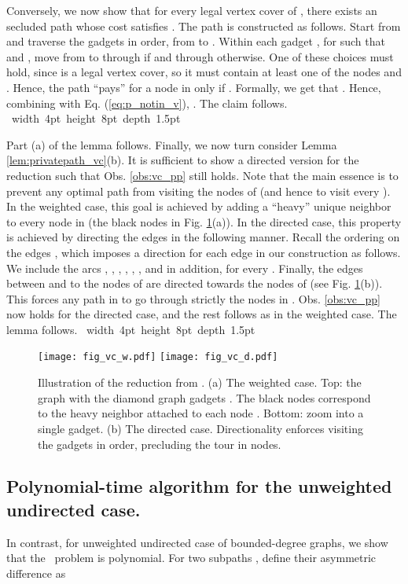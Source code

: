 \documentclass[12pt]{article}
\def\blackslug{\hbox{\hskip 1pt \vrule width 4pt height 8pt
    depth 1.5pt \hskip 1pt}}
\def\QED{\quad\blackslug\lower 8.5pt\null\par}
\newcommand{\PP}[0]{ }
\begin{document}
Conversely, we now show that for every legal vertex cover  of , there exists an
 secluded path  whose cost satisfies . The path  is constructed as follows. Start from  and traverse the gadgets  in order, from  to . Within each gadget , for  such that  and ,
move from  to  through  if  and through  otherwise. One of these choices must hold, since  is a legal vertex cover, so it must contain at least one of the nodes  and . Hence, the path  ``pays'' for a node  in  only if . Formally, we get that . Hence, combining with Eq. (\ref{eq:p_notin_v}), . The claim follows.
\QED
Part (a) of the lemma follows.
Finally, we now turn consider Lemma \ref{lem:privatepath_vc}(b).
It is sufficient to show a directed version for the reduction such that Obs. \ref{obs:vc_pp} still holds. Note that the main essence is to prevent any optimal path from visiting the nodes of  (and hence to visit every ). In the weighted case, this goal is achieved by adding a ``heavy'' unique neighbor to every node in  (the black nodes in Fig. \ref{fig:vc}(a)). In the directed case, this property is achieved by directing the edges  in the following manner.
Recall the ordering  on the edges , which imposes a direction for each edge in our construction as follows.
We include the arcs , , , , , , and in addition,  for every . Finally, the edges between  and  to the nodes of  are directed towards the nodes of  (see Fig. \ref{fig:vc}(b)).  This forces any  path in  to go through strictly the nodes in . Obs. \ref{obs:vc_pp} now holds for the directed case, and the rest follows as in the weighted case. The lemma follows.
\QED
\begin{figure}[h!]
\begin{center}
\texttt{[image: fig\_vc\_w.pdf]}
\hfill
\texttt{[image: fig\_vc\_d.pdf]}
\caption{ \label{fig:vc}
\sf
Illustration of the reduction from . (a) The weighted case. Top: the graph  with the diamond graph gadgets . The black nodes correspond to the heavy neighbor attached to each node . Bottom: zoom into a single gadget. (b) The directed case. Directionality enforces visiting the gadgets in order, precluding the tour in  nodes.
}
\end{center}
\end{figure}

\subsection{Polynomial-time algorithm for the unweighted undirected case.}
In contrast, for unweighted undirected case of bounded-degree graphs, we show that the \PP\ problem is polynomial.
For two subpaths , define their asymmetric difference as
\end{document}
